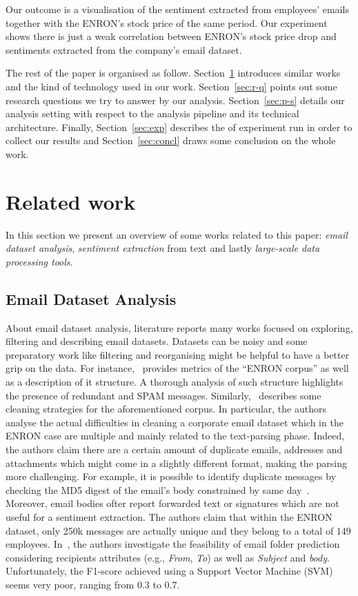 \documentclass{vldb}
\begin{document}
Our outcome is a visualisation of the sentiment extracted from employees' emails together with the ENRON's stock price of the same period.
Our experiment shows there is just a weak correlation between ENRON's stock price drop and sentiments extracted from the company's email dataset. 

The rest of the paper is organised as follow.
Section~\ref{sec:r-w} introduces similar works and the kind of technology used in our work.
Section~\ref{sec:r-q} points out some research questions we try to answer by our analysis.
Section~\ref{sec:p-s} details our analysis setting with respect to the analysis pipeline and its technical architecture. 
Finally, Section~\ref{sec:exp} describes the of experiment run in order to collect our results and Section~\ref{sec:concl} draws some conclusion on the whole work.



\section{Related work}
\label{sec:r-w}
In this section we present an overview of some works related to this paper:
\textit{email dataset analysis}, \textit{sentiment extraction} from text and lastly \textit{large-scale data processing tools}.

\subsection{Email Dataset Analysis}
\label{sub-sec:email-dataset-analysis}
About email dataset analysis, literature reports many works focused on exploring, filtering and describing email datasets.
Datasets can be noisy and some preparatory work like filtering and reorganising might be helpful to have a better grip on the data.
For instance,~\cite{klimt2004introducing} provides metrics of the ``ENRON corpus'' as well as a description of it structure.
A thorough analysis of such structure highlights the presence of redundant and SPAM messages.
Similarly,~\cite{zhou2007strategies} describes some cleaning strategies for the aforementioned corpus.
In particular, the authors analyse the actual difficulties in cleaning a corporate email dataset which in the ENRON case are multiple and mainly related to the text-parsing phase.
Indeed, the authors claim there are a certain amount of duplicate emails, addresses and attachments which might come in a slightly different format, making the parsing more challenging.
For example, it is possible to identify duplicate messages by checking the MD5 digest of the email's body constrained by same day~\cite{corrada2004enron}.
Moreover, email bodies ofter report forwarded text or signatures which are not useful for a sentiment extraction.
The authors claim that within the ENRON dataset, only 250k messages are actually unique and they belong to a total of 149 employees.
In~\cite{klimt2004enron}, the authors investigate the feasibility of email folder prediction considering recipients attributes (e.g., \textit{From}, \textit{To}) as well as \textit{Subject} and \textit{body}.
Unfortunately, the F1-score achieved using a Support Vector Machine (SVM) seems very poor, ranging from $0.3$ to $0.7$. 
\end{document}
